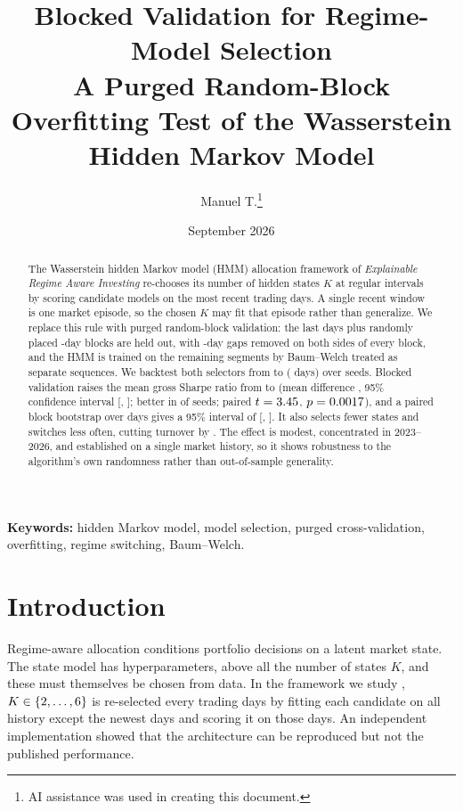 \documentclass[11pt]{article}
\title{\textbf{Blocked Validation for Regime-Model Selection}\\
\large A Purged Random-Block Overfitting Test of the Wasserstein Hidden Markov Model}
\author{Manuel T.\thanks{AI assistance was used in creating this document.}}
\date{September 2026}
\begin{document}
\maketitle

\begin{abstract}
The Wasserstein hidden Markov model (HMM) allocation framework of \emph{Explainable Regime Aware Investing} re-chooses its number of hidden states $K$ at regular intervals by scoring candidate models on the most recent \ValidationDays{} trading days. A single recent window is one market episode, so the chosen $K$ may fit that episode rather than generalize. We replace this rule with purged random-block validation: the last \HoldoutDays{} days plus \RandomBlocks{} randomly placed \BlockLen{}-day blocks are held out, with \GapDays{}-day gaps removed on both sides of every block, and the HMM is trained on the remaining segments by Baum--Welch treated as separate sequences. We backtest both selectors from \OOSStart{} to \OOSEnd{} (\OOSObs{} days) over \NSeeds{} seeds. Blocked validation raises the mean gross Sharpe ratio from \SeedBaseSharpe{} to \SeedBlkSharpe{} (mean difference \DSharpeMean{}, 95\% confidence interval [\DSharpeLo{}, \DSharpeHi{}]; better in \SeedsBetter{} of \NSeeds{} seeds; paired $t=3.45{}$, $p=0.0017{}$), and a paired block bootstrap over days gives a 95\% interval of [\BootLoTwenty{}, \BootHiTwenty{}]. It also selects fewer states and switches less often, cutting turnover by \TurnoverCut{}. The effect is modest, concentrated in 2023--2026, and established on a single market history, so it shows robustness to the algorithm's own randomness rather than out-of-sample generality.
\end{abstract}

\noindent\textbf{Keywords:} hidden Markov model, model selection, purged cross-validation, overfitting, regime switching, Baum--Welch.

\section{Introduction}

Regime-aware allocation conditions portfolio decisions on a latent market state. The state model has hyperparameters, above all the number of states $K$, and these must themselves be chosen from data. In the framework we study \cite{boukardagha2026}, $K\in\{2,\ldots,6{}\}$ is re-selected every \OrderFrequency{} trading days by fitting each candidate on all history except the newest \ValidationDays{} days and scoring it on those days. An independent implementation \cite{replicationpaper} showed that the architecture can be reproduced but not the published performance.
\end{document}
